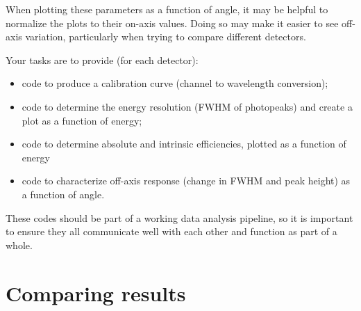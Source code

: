 \documentclass{tufte-book}
\begin{document}
When plotting these parameters as a function of angle, it may be helpful to normalize the plots to their on-axis values. Doing so may make it easier to see off-axis variation, particularly when trying to compare different detectors.

\begin{tcolorbox}[sharp corners=all, colback=white!75!green, title=Primary Summary]

Your tasks are to provide (for each detector):
\begin{itemize}
\item code to produce a calibration curve (channel to wavelength conversion);
\item code to determine the energy resolution (FWHM of photopeaks) and create a plot as a function of energy;
\item code to determine absolute and intrinsic efficiencies, plotted as a function of energy
\item code to characterize off-axis response (change in FWHM and peak height) as a function of angle.
\end{itemize}


These codes should be part of a working data analysis pipeline, so it is important to ensure they all communicate well with each other and function as part of a whole.



\end{tcolorbox} 





\section{Comparing results}
\label{sec:he-compare-results}
\end{document}
